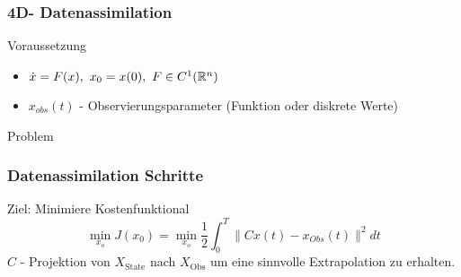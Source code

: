 \begin{frame}
\frametitle{4D- Datenassimilation}
\vspace*{-0.1cm} 
    \begin{block}{Voraussetzung}
    \parbox[c][3.5\baselineskip][t]{\textwidth}{
     \begin{itemize}
     \item $\dot{x} = F(x),~ x_0 = x(0),~F\in C^1(\mathbb R^n)$
     \item $x_{obs}(t)$ - Observierungsparameter (Funktion oder diskrete Werte)
    \end{itemize}
    } 
   \end{block}
   \vspace*{-0.1cm} 
   \begin{block}{Problem}
   \end{block}
\end{frame}



\begin{frame}[<+->]
  \frametitle{Datenassimilation Schritte}
	\begin{block}{Ziel: Minimiere Kostenfunktional}
	\begin{equation}\label{eq:costFunctional}
		\min_{x_o} J(x_0) = \min_{x_o} \frac{1}{2}\int_0^T \|Cx(t) - x_{Obs}(t)\|^2dt
	\end{equation}
	  $C$ - Projektion von $X_{\text{State}}$ nach $X_{\text{Obs}}$ um eine sinnvolle Extrapolation zu erhalten.
	\end{block}
\end{frame}
 

